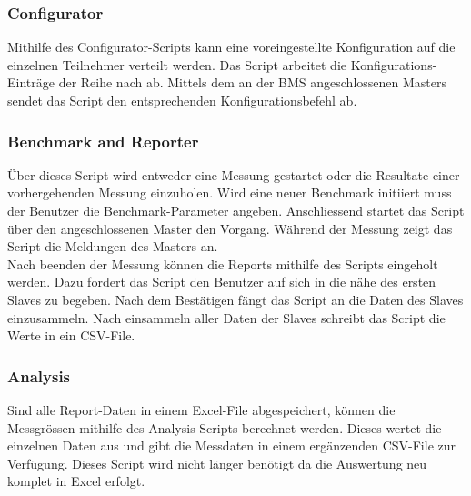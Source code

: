 \subsubsection{Configurator}\label{subsubsec:Configurator}

Mithilfe des Configurator-Scripts kann eine voreingestellte Konfiguration auf die einzelnen Teilnehmer verteilt werden. Das Script arbeitet die Konfigurations-Einträge der Reihe nach ab. Mittels dem an der BMS angeschlossenen Masters sendet das Script den entsprechenden Konfigurationsbefehl ab. 

\subsubsection{Benchmark and Reporter}\label{subsubsec:BenchmarkandReporter}

Über dieses Script wird entweder eine Messung gestartet oder die Resultate einer vorhergehenden Messung einzuholen. Wird eine neuer Benchmark initiiert muss der Benutzer die Benchmark-Parameter angeben. Anschliessend startet das Script über den angeschlossenen Master den Vorgang. Während der Messung zeigt das Script die Meldungen des Masters an. \\

Nach beenden der Messung können die Reports mithilfe des Scripts eingeholt werden. Dazu fordert das Script den Benutzer auf sich in die nähe des ersten Slaves zu begeben. Nach dem Bestätigen fängt das Script an die Daten des Slaves einzusammeln. Nach einsammeln aller Daten der Slaves schreibt das Script die Werte in ein CSV-File. 

\subsubsection{Analysis}\label{subsubsec:Analysis}

Sind alle Report-Daten in einem Excel-File abgespeichert, können die Messgrössen mithilfe des Analysis-Scripts berechnet werden. Dieses wertet die einzelnen Daten aus und gibt die Messdaten in einem ergänzenden CSV-File zur Verfügung. Dieses Script wird nicht länger benötigt da die Auswertung neu komplet in Excel erfolgt. 

